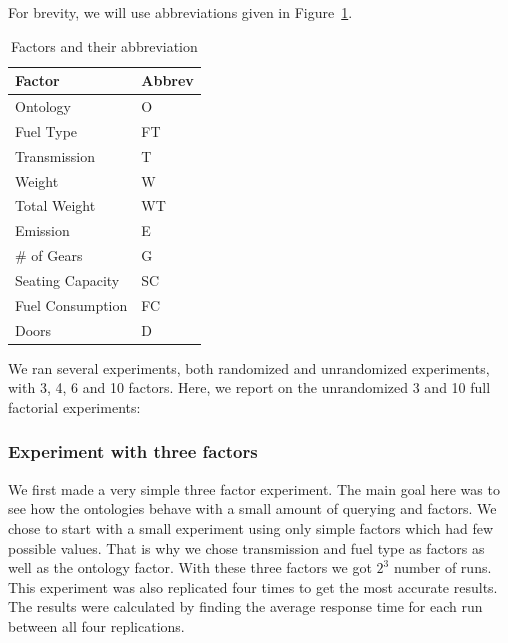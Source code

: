 \documentclass{llncs}
\begin{document}
For brevity, we will use abbreviations given in Figure~\ref{facandabbrev}.

\begin{table}
    \begin{tabular}{ | l | l |}
    \hline
    {\bf Factor} & {\bf Abbrev} \\ \hline
   Ontology & \textsf{O} \\
   Fuel Type & \textsf{FT} \\
   Transmission & \textsf{T} \\
   Weight & \textsf{W} \\
   Total Weight & \textsf{WT} \\
   Emission & \textsf{E} \\
   \# of Gears & \textsf{G} \\
   Seating Capacity & \textsf{SC} \\
   Fuel Consumption & \textsf{FC} \\
   Doors & \textsf{D} \\
\hline
    \end{tabular}
\caption{Factors and their abbreviation}\label{facandabbrev}
\end{table}


We ran several experiments, both randomized and unrandomized
experiments, with 3, 4, 6 and 10 factors. Here, we report on the
unrandomized 3 and 10 full factorial experiments:
  
\subsubsection{Experiment with three factors}
We first made a very simple three factor experiment. The main goal here was
to see how the ontologies behave with a small amount of querying and
factors. We chose to start with a small experiment using only
simple factors which had few possible values. That is why we chose
transmission and fuel type as factors as well as the ontology
factor. With these three factors we got $2^3$ number of runs. This
experiment was also replicated four times to get the most accurate
results.  The results were calculated by finding the average response
time for each run between all four replications.
\end{document}
